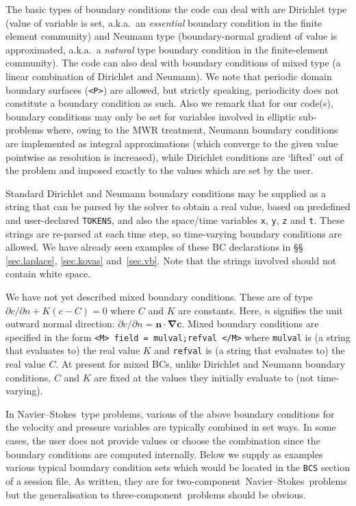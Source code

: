 \documentclass[11pt]{report}
\newcommand\twoc{two-com\-po\-nent}
\newcommand\threec{three-com\-po\-nent}
\newcommand\NavSto{Navier--Stokes}
\begin{document}
The basic types of boundary conditions the code can deal with are
Dirichlet type (value of variable is set, a.k.a.\ an \emph{essential}
boundary condition in the finite element community) and Neumann type
(boundary-normal gradient of value is approximated, a.k.a.\ a
\emph{natural} type boundary condition in the finite-element
community). The code can also deal with boundary conditions of mixed
type (a linear combination of Dirichlet and Neumann). We note that
periodic domain boundary surfaces (\verb|<P>|) are allowed, but
strictly speaking, periodicity does not constitute a boundary
condition as such.  Also we remark that for our code(s), boundary
conditions may only be set for variables involved in elliptic
sub-problems where, owing to the MWR treatment, Neumann boundary
conditions are implemented as integral approximations (which converge
to the given value pointwise as resolution is increased), while
Dirichlet conditions are `lifted' out of the problem and imposed
exactly to the values which are set by the user.

Standard Dirichlet and Neumann boundary conditions may be supplied as
a string that can be parsed by the solver to obtain a real value,
based on predefined and user-declared \verb|TOKENS|, and also the
space/time variables \verb|x|, \verb|y|, \verb|z| and \verb|t|.  These
strings are re-parsed at each time step, so time-varying boundary
conditions are allowed. We have already seen examples of these BC
declarations in \S\S\,\ref{sec.laplace}, \ref{sec.kovas}
and~\ref{sec.vb}.  Note that the strings involved should not contain
white space.  

We have not yet described mixed boundary conditions.  These are of
type $\partial c/\partial n+K(c-C)=0$ where $C$ and $K$ are constants.
Here, $n$ signifies the unit outward normal direction: $\partial
c/\partial n=\bm{n\cdot\nabla c}$.  Mixed boundary conditions are
specified in the form \verb|<M> field = mulval;refval </M>| where
\verb|mulval| is (a string that evaluates to) the real value $K$ and
\verb+refval+ is (a string that evaluates to) the real value $C$.  At
present for mixed BCs, unlike Dirichlet and Neumann boundary
conditions, $C$ and $K$ are fixed at the values they initially
evaluate to (not time-varying).

In \NavSto\ type problems, various of the above boundary conditions
for the velocity and pressure variables are typically combined in set
ways.  In some cases, the user does not provide values or choose the
combination since the boundary conditions are computed internally.
Below we supply as examples various typical boundary condition sets
which would be located in the \verb+BCS+ section of a session file.
As written, they are for \twoc\ \NavSto\ problems but the
generalisation to \threec\ problems should be obvious.
\end{document}
